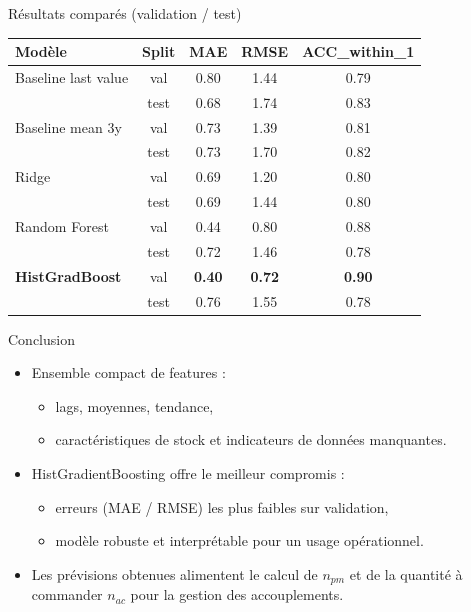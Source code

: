 \documentclass[aspectratio=169]{beamer}
\begin{document}
\begin{frame}{Résultats comparés (validation / test)}
  \small
  \begin{tabular}{lcccc}
    \toprule
    Modèle & Split & MAE & RMSE & ACC\_within\_1 \\
    \midrule
    Baseline last value & val & 0.80 & 1.44 & 0.79 \\
                        & test & 0.68 & 1.74 & 0.83 \\
    Baseline mean 3y    & val & 0.73 & 1.39 & 0.81 \\
                        & test & 0.73 & 1.70 & 0.82 \\
    Ridge               & val & 0.69 & 1.20 & 0.80 \\
                        & test & 0.69 & 1.44 & 0.80 \\
    Random Forest       & val & 0.44 & 0.80 & 0.88 \\
                        & test & 0.72 & 1.46 & 0.78 \\
    \textbf{HistGradBoost} & val & \textbf{0.40} & \textbf{0.72} & \textbf{0.90} \\
                        & test & 0.76 & 1.55 & 0.78 \\
    \bottomrule
  \end{tabular}
\end{frame}

\begin{frame}{Conclusion}
  \begin{itemize}
    \item Ensemble compact de features :
      \begin{itemize}
        \item lags, moyennes, tendance,
        \item caractéristiques de stock et indicateurs de données manquantes.
      \end{itemize}
    \item HistGradientBoosting offre le meilleur compromis :
      \begin{itemize}
        \item erreurs (MAE / RMSE) les plus faibles sur validation,
        \item modèle robuste et interprétable pour un usage opérationnel.
      \end{itemize}
    \item Les prévisions obtenues alimentent le calcul de $n_{pm}$ et de la quantité à commander $n_{ac}$ pour la gestion des accouplements.
  \end{itemize}
\end{frame}
\end{document}
